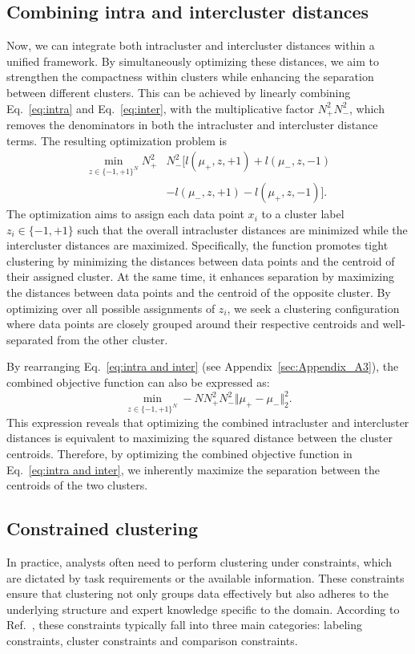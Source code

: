 \documentclass[showpacs,twocolumn,superscriptaddress]{revtex4-2}
\begin{document}
\subsection{Combining intra and intercluster distances}
\label{sec:intrainter}
Now, we can integrate both intracluster and intercluster distances within a unified framework. By simultaneously optimizing these distances, we aim to strengthen the compactness within clusters while enhancing the separation between different clusters. This can be achieved by linearly combining Eq.~\eqref{eq:intra} and Eq.~\eqref{eq:inter}, with the multiplicative factor $N_+^2N_-^2$, which removes the denominators in both the intracluster and intercluster distance terms. The resulting optimization problem is
\begin{align}
    \label{eq:intra and inter}
    \min_{z \in \{-1,+1\}^N} N_+^2&N_-^2[l(\mu_+,z,+1) 
    + l(\mu_-,z,-1) \nonumber\\
    &- l(\mu_-,z,+1)-l(\mu_+,z,-1)].
\end{align}
The optimization aims to assign each data point $x_i$ to a cluster label $z_i \in \{-1,+1\}$ such that the overall intracluster distances are minimized while the intercluster distances are maximized. Specifically, the function promotes tight clustering by minimizing the distances between data points and the centroid of their assigned cluster. At the same time, it enhances separation by maximizing the distances between data points and the centroid of the opposite cluster. By optimizing over all possible assignments of $z_i$, we seek a clustering configuration where data points are closely grouped around their respective centroids and well-separated from the other cluster.

By rearranging Eq.~\eqref{eq:intra and inter} (see Appendix~\ref{sec:Appendix_A3}), the combined objective function can also be expressed as:
\begin{equation}
    \label{eq:intra and inter2}
    \min_{z \in \{-1,+1\}^N} -NN^2_{+}N^2_{-}\Vert\mu_{+} - \mu_{-} \Vert_2^2.
\end{equation}
This expression reveals that optimizing the combined intracluster and intercluster distances is equivalent to maximizing the squared distance between the cluster centroids. Therefore, by optimizing the combined objective function in Eq.~\eqref{eq:intra and inter}, we inherently maximize the separation between the centroids of the two clusters.

\subsection{Constrained clustering}
In practice, analysts often need to perform clustering under constraints, which are dictated by task requirements or the available information. These constraints ensure that clustering not only groups data effectively but also adheres to the underlying structure and expert knowledge specific to the domain. According to Ref.~\cite{ganccarski2020constrained}, these constraints typically fall into three main categories: labeling constraints, cluster constraints and comparison constraints.
\end{document}
